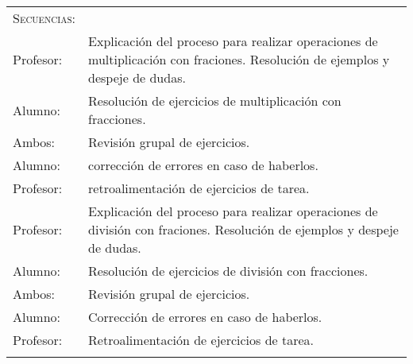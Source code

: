 \documentclass[letterpaper,10pt]{article}
\begin{document}
\begin{tabular}[t]{R{0.25\textwidth}p{0.71\textwidth}}

    \textsc{\large Secuencias:} \\
    Profesor: & Explicaci\'on del proceso para realizar operaciones de
    multiplicaci\'on con fraciones. Resoluci\'on de ejemplos y despeje de dudas.
    \\ Alumno: & Resoluci\'on de ejercicios de multiplicaci\'on con fracciones.
    \\ Ambos: & Revisi\'on grupal de ejercicios. \\ Alumno: & correcci\'on de
    errores en caso de haberlos. \\ Profesor: & retroalimentaci\'on de
    ejercicios de tarea. \\ Profesor: & Explicaci\'on del proceso para realizar
    operaciones de divisi\'on con fraciones. Resoluci\'on de ejemplos y despeje
    de dudas. \\ Alumno: & Resoluci\'on de ejercicios de divisi\'on con
    fracciones. \\ Ambos: & Revisi\'on grupal de ejercicios. \\ Alumno: &
    Correcci\'on de errores en caso de haberlos. \\ Profesor: &
    Retroalimentaci\'on de ejercicios de tarea.

\\ \hline \\


\end{tabular}
\end{document}
